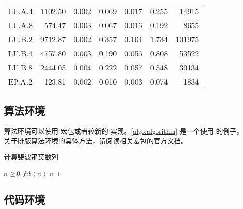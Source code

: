 \begin{ThreePartTable}
\begin{longtable}[c]{c*{6}{r}}
        LU.A.4                 & 1102.50                             & 0.002                               & 0.069          & 0.017 & 0.255 & 14915  \\
        LU.A.8                 & 574.47                              & 0.003                               & 0.067          & 0.016 & 0.192 & 8655   \\
        LU.B.2                 & 9712.87                             & 0.002                               & 0.357          & 0.104 & 1.734 & 101975 \\
        LU.B.4                 & 4757.80                             & 0.003                               & 0.190          & 0.056 & 0.808 & 53522  \\
        LU.B.8                 & 2444.05                             & 0.004                               & 0.222          & 0.057 & 0.548 & 30134  \\
        EP.A.2                 & 123.81                              & 0.002                               & 0.010          & 0.003 & 0.074 & 1834   \\
        \bottomrule
    \end{longtable}
\end{ThreePartTable}

\subsection{算法环境}

算法环境可以使用  宏包或者较新的  实现。\cref{algo:algorithm} 是一个使用  的例子。关于排版算法环境的具体方法，请阅读相关宏包的官方文档。

\begin{algorithm}
    \caption{计算斐波那契数列}\label{algo:algorithm}
    \begin{algorithmic}[1]
        \Require $n \geq 0$
        \Ensure $fib(n)$
        \State \Return $n$
        \Else
        \State \Return {} + 
        \EndIf
        \EndFunction
    \end{algorithmic}
\end{algorithm}

\subsection{代码环境}

